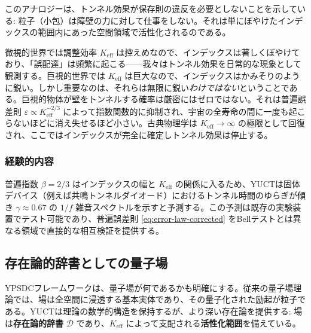\documentclass[12pt,a4paper]{article}
\theoremstyle{definition}
\theoremstyle{remark}
\begin{document}
	このアナロジーは、トンネル効果が保存則の違反を必要としないことを示している: 粒子（小包）は障壁の力に対して仕事をしない。それは単にぼやけたインデックスの範囲内にあった空間領域で活性化されるのである。
	
	微視的世界では調整効率 $K_{\mathrm{eff}}$ は控えめなので、インデックスは著しくぼやけており、「誤配達」は頻繁に起こる——我々はトンネル効果を日常的な現象として観測する。巨視的世界では $K_{\mathrm{eff}}$ は巨大なので、インデックスはかみそりのように鋭い。しかし重要なのは、それらは無限に鋭い\emph{わけではない}ということである。巨視的物体が壁をトンネルする確率は厳密にはゼロではない。それは普遍誤差則 $\varepsilon \propto K_{\mathrm{eff}}^{-2/3}$ によって指数関数的に抑制され、宇宙の全寿命の間に一度も起こらないほどに消え失せるほど小さい。古典物理学は $K_{\mathrm{eff}} \to \infty$ の極限として回復され、ここではインデックスが完全に確定しトンネル効果は停止する。
	
	\subsubsection{経験的内容}
	
	普遍指数 $\beta=2/3$ はインデックスの幅と $K_{\mathrm{eff}}$ の関係に入るため、YUCTは固体デバイス（例えば共鳴トンネルダイオード）におけるトンネル時間のゆらぎが傾き $\gamma \approx 0.67$ の $1/f$ 雑音スペクトルを示すと予測する。この予測は既存の実験装置でテスト可能であり、普遍誤差則 \eqref{eq:error-law-corrected} をBellテストとは異なる領域で直接的な相互検証を提供する。
	
	\medskip
	
	\subsection{存在論的辞書としての量子場}
	
	YPSDCフレームワークは、量子場が何であるかも明確にする。従来の量子場理論では、場は全空間に浸透する基本実体であり、その量子化された励起が粒子である。YUCTは理論の数学的構造を保持するが、より深い存在論を提供する: 場は\textbf{存在論的辞書} $\mathcal{D}$ であり、$K_{\mathrm{eff}}$ によって支配される\textbf{活性化範囲}を備えている。
	
\end{document}
